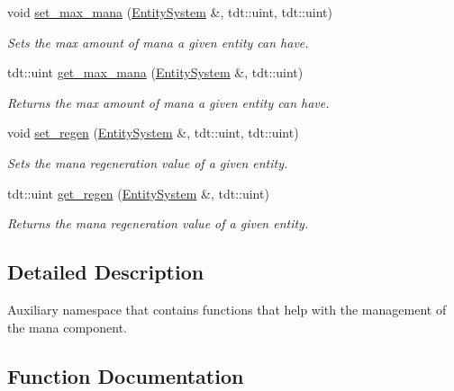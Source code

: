 \begin{DoxyCompactItemize}
void \hyperlink{namespace_mana_helper_a1ad0f5f05aa633616fd4bbcf4c8f8fe4}{set\+\_\+max\+\_\+mana} (\hyperlink{class_entity_system}{Entity\+System} \&, tdt\+::uint, tdt\+::uint)
\begin{DoxyCompactList}\small\item\em Sets the max amount of mana a given entity can have. \end{DoxyCompactList}\item 
tdt\+::uint \hyperlink{namespace_mana_helper_ae13b6f7921cb4d462b0be8b9f1db7a38}{get\+\_\+max\+\_\+mana} (\hyperlink{class_entity_system}{Entity\+System} \&, tdt\+::uint)
\begin{DoxyCompactList}\small\item\em Returns the max amount of mana a given entity can have. \end{DoxyCompactList}\item 
void \hyperlink{namespace_mana_helper_adadffb7032878d31d881155559c63799}{set\+\_\+regen} (\hyperlink{class_entity_system}{Entity\+System} \&, tdt\+::uint, tdt\+::uint)
\begin{DoxyCompactList}\small\item\em Sets the mana regeneration value of a given entity. \end{DoxyCompactList}\item 
tdt\+::uint \hyperlink{namespace_mana_helper_a9f3bb639fc8a470c0b7fa0e3a8af8041}{get\+\_\+regen} (\hyperlink{class_entity_system}{Entity\+System} \&, tdt\+::uint)
\begin{DoxyCompactList}\small\item\em Returns the mana regeneration value of a given entity. \end{DoxyCompactList}\end{DoxyCompactItemize}


\subsection{Detailed Description}
Auxiliary namespace that contains functions that help with the management of the mana component. 

\subsection{Function Documentation}
